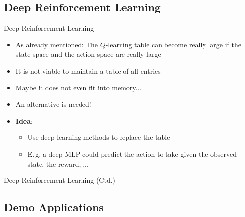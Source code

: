 \subsection{Deep Reinforcement Learning}

\begin{frame}{Deep Reinforcement Learning}{}
	\begin{itemize}
		\item As already mentioned: The $Q$-learning table can become really large if the state space and the
			action space are really large
		\item It is not viable to maintain a table of all entries
		\item Maybe it does not even fit into memory...
		\item An alternative is needed!
		\item \textbf{Idea}:
		\begin{itemize}
			\item Use deep learning methods to replace the table
			\item E.\,g. a deep MLP could predict the action to take
				given the observed state, the reward, ...
		\end{itemize}
	\end{itemize}
\end{frame}


\begin{frame}{Deep Reinforcement Learning (Ctd.)}{}
	
\end{frame}


\subsection{Demo Applications}


